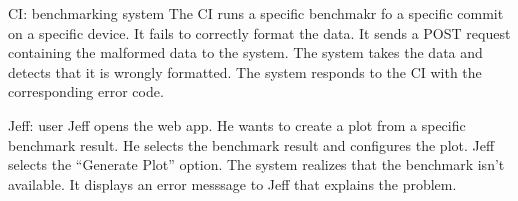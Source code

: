 {CI: \Gls{benchmarking system}}
{The CI runs a specific benchmakr fo a specific commit on a specific device. It fails to correctly format the data. It sends a POST request containing the malformed data to the system. The system takes the data and detects that it is wrongly formatted. The system responds to the CI with the corresponding error code.}

{Jeff: \Gls{user}}
{Jeff opens the web app. He wants to create a \gls{plot} from a specific benchmark result. He selects the benchmark result and configures the \gls{plot}. Jeff selects the \enquote{Generate Plot} option. The system realizes that the benchmark isn't available. It displays an error messsage to Jeff that explains the problem.}

